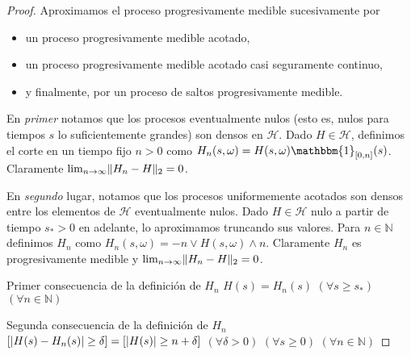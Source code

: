 \documentclass{report}
\newcommand{\characteristic}{\mathbbm{1}}
\newcommand{\naturalNumbers}{\mathbb{N}}
\DeclarePairedDelimiter{\abs}{\lvert}{\rvert}
\DeclarePairedDelimiter{\norm}{\|}{\|}
\theoremstyle{plain}
\theoremstyle{remark}
\theoremstyle{definition}
\begin{document}
\begin{proof}
  Aproximamos el proceso progresivamente medible sucesivamente por
  \begin{itemize}
    \item un proceso progresivamente medible acotado,
    \item un proceso progresivamente medible acotado casi seguramente continuo,
    \item y finalmente, por un proceso de saltos progresivamente medible.
  \end{itemize}
  
  En \emph{primer} notamos que los procesos eventualmente nulos (esto es, nulos para tiempos \(s\) lo suficientemente grandes) son densos en \(\mathcal{H}\).
  Dado \(H \in \mathcal{H}\), definimos el corte en un tiempo fijo \(n > 0\) como \(H_n(s, \omega) = H(s, \omega) \characteristic_{[0, n]}(s)\).
  Claramente \(\lim_{n \rightarrow \infty} \norm{H_n - H}_2 = 0\).

  En \emph{segundo} lugar, notamos que los procesos uniformemente acotados son densos entre los elementos de \(\mathcal{H}\) eventualmente nulos.
  Dado \(H \in \mathcal{H}\) nulo a partir de tiempo \(s_* > 0\) en adelante, lo aproximamos truncando sus valores.
  Para \(n \in \naturalNumbers\) definimos \(H_n\) como \(H_n(s, \omega) = -n \vee H(s, \omega) \wedge n\).
  Claramente \(H_n\) es progresivamente medible y \(\lim_{n \rightarrow \infty} \norm{H_n - H}_2 = 0\).


  Primer consecuencia de la definición de \(H_n\) 
  \(H(s) = H_n(s)\) \((\forall s \geq s_*)\) \((\forall n \in \naturalNumbers)\)

  Segunda consecuencia de la definición de \(H_n\) 
  \([\abs{H(s) - H_n(s)} \geq \delta] = [\abs{H(s)} \geq n + \delta]\) \((\forall \delta > 0)\) \((\forall s \geq 0)\) \((\forall n \in \naturalNumbers)\)


\end{proof}
\end{document}
